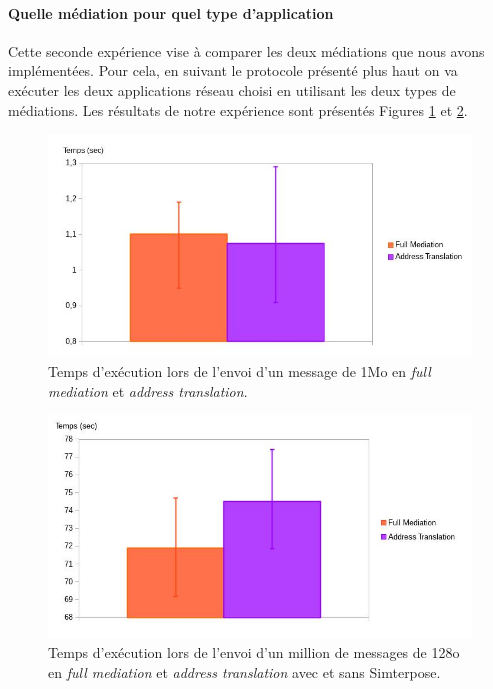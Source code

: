 \paragraph{Quelle médiation pour quel type d'application}
 Cette seconde expérience vise à comparer les deux médiations que nous avons implémentées. Pour cela, en suivant le protocole présenté plus haut on va exécuter les deux applications réseau choisi en utilisant les deux types de médiations. Les résultats de notre expérience sont présentés Figures \ref{Network_Big_Mediation} et \ref{Network_Little_Mediation}.

 \begin{figure}[H]
  \centering
    \includegraphics[scale=0.5]{mesures/graph/Bigmsg.jpg}
    \caption{Temps d'exécution lors de l'envoi d'un message de 1Mo en \textit{full mediation} et \textit{address translation}.}
    \label{Network_Big_Mediation}
\end{figure}

\begin{figure}[H]
  \centering
    \includegraphics[scale=0.5]{mesures/graph/Littlemsg.jpg}
    \caption{Temps d'exécution lors de l'envoi d'un million de messages de 128o en \textit{full mediation} et \textit{address translation} avec et sans Simterpose.}
    \label{Network_Little_Mediation}
\end{figure}

